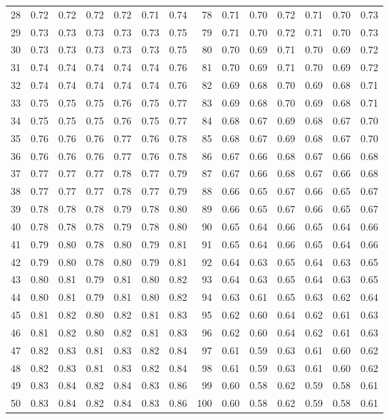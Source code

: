 \documentclass[11pt,a4paper]{article}
\begin{document}
\begin{table}[htbp]
\begin{tabular}{rllllll@{\hspace{8pt}}rllllll}
28 & 0.72 & 0.72 & 0.72 & 0.72 & 0.71 & 0.74 & 78 & 0.71 & 0.70 & 0.72 & 0.71 & 0.70 & 0.73 \\
29 & 0.73 & 0.73 & 0.73 & 0.73 & 0.73 & 0.75 & 79 & 0.71 & 0.70 & 0.72 & 0.71 & 0.70 & 0.73 \\
30 & 0.73 & 0.73 & 0.73 & 0.73 & 0.73 & 0.75 & 80 & 0.70 & 0.69 & 0.71 & 0.70 & 0.69 & 0.72 \\
31 & 0.74 & 0.74 & 0.74 & 0.74 & 0.74 & 0.76 & 81 & 0.70 & 0.69 & 0.71 & 0.70 & 0.69 & 0.72 \\
32 & 0.74 & 0.74 & 0.74 & 0.74 & 0.74 & 0.76 & 82 & 0.69 & 0.68 & 0.70 & 0.69 & 0.68 & 0.71 \\
33 & 0.75 & 0.75 & 0.75 & 0.76 & 0.75 & 0.77 & 83 & 0.69 & 0.68 & 0.70 & 0.69 & 0.68 & 0.71 \\
34 & 0.75 & 0.75 & 0.75 & 0.76 & 0.75 & 0.77 & 84 & 0.68 & 0.67 & 0.69 & 0.68 & 0.67 & 0.70 \\
35 & 0.76 & 0.76 & 0.76 & 0.77 & 0.76 & 0.78 & 85 & 0.68 & 0.67 & 0.69 & 0.68 & 0.67 & 0.70 \\
36 & 0.76 & 0.76 & 0.76 & 0.77 & 0.76 & 0.78 & 86 & 0.67 & 0.66 & 0.68 & 0.67 & 0.66 & 0.68 \\
37 & 0.77 & 0.77 & 0.77 & 0.78 & 0.77 & 0.79 & 87 & 0.67 & 0.66 & 0.68 & 0.67 & 0.66 & 0.68 \\
38 & 0.77 & 0.77 & 0.77 & 0.78 & 0.77 & 0.79 & 88 & 0.66 & 0.65 & 0.67 & 0.66 & 0.65 & 0.67 \\
39 & 0.78 & 0.78 & 0.78 & 0.79 & 0.78 & 0.80 & 89 & 0.66 & 0.65 & 0.67 & 0.66 & 0.65 & 0.67 \\
40 & 0.78 & 0.78 & 0.78 & 0.79 & 0.78 & 0.80 & 90 & 0.65 & 0.64 & 0.66 & 0.65 & 0.64 & 0.66 \\
41 & 0.79 & 0.80 & 0.78 & 0.80 & 0.79 & 0.81 & 91 & 0.65 & 0.64 & 0.66 & 0.65 & 0.64 & 0.66 \\
42 & 0.79 & 0.80 & 0.78 & 0.80 & 0.79 & 0.81 & 92 & 0.64 & 0.63 & 0.65 & 0.64 & 0.63 & 0.65 \\
43 & 0.80 & 0.81 & 0.79 & 0.81 & 0.80 & 0.82 & 93 & 0.64 & 0.63 & 0.65 & 0.64 & 0.63 & 0.65 \\
44 & 0.80 & 0.81 & 0.79 & 0.81 & 0.80 & 0.82 & 94 & 0.63 & 0.61 & 0.65 & 0.63 & 0.62 & 0.64 \\
45 & 0.81 & 0.82 & 0.80 & 0.82 & 0.81 & 0.83 & 95 & 0.62 & 0.60 & 0.64 & 0.62 & 0.61 & 0.63 \\
46 & 0.81 & 0.82 & 0.80 & 0.82 & 0.81 & 0.83 & 96 & 0.62 & 0.60 & 0.64 & 0.62 & 0.61 & 0.63 \\
47 & 0.82 & 0.83 & 0.81 & 0.83 & 0.82 & 0.84 & 97 & 0.61 & 0.59 & 0.63 & 0.61 & 0.60 & 0.62 \\
48 & 0.82 & 0.83 & 0.81 & 0.83 & 0.82 & 0.84 & 98 & 0.61 & 0.59 & 0.63 & 0.61 & 0.60 & 0.62 \\
49 & 0.83 & 0.84 & 0.82 & 0.84 & 0.83 & 0.86 & 99 & 0.60 & 0.58 & 0.62 & 0.59 & 0.58 & 0.61 \\
50 & 0.83 & 0.84 & 0.82 & 0.84 & 0.83 & 0.86 & 100 & 0.60 & 0.58 & 0.62 & 0.59 & 0.58 & 0.61 \\
\bottomrule
\end{tabular}
\end{table}
\end{document}
